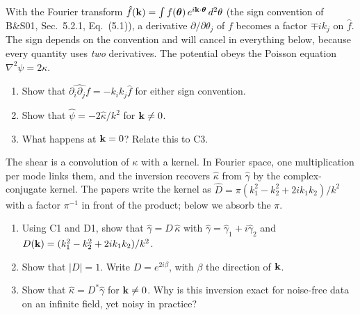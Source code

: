 
\begin{given}
With the Fourier transform $\hat f(\mathbf{k}) = \int f(\bm\theta)\,e^{i\mathbf{k}\cdot\bm\theta}\,d^2\theta$ (the sign convention of
B\&S01, Sec.~5.2.1, Eq.~(5.1)), a derivative $\partial/\partial\theta_j$ of $f$ becomes a factor $\mp i k_j$ on
$\hat f$. The sign depends on the convention and will cancel in everything below, because every quantity uses
\emph{two} derivatives. The potential obeys the Poisson equation $\nabla^2\psi = 2\kappa$.
\end{given}


\begin{enumerate}
  \item Show that $\widehat{\partial_i\partial_j f} = -k_ik_j\hat f$ for either sign convention.
  \item Show that $\hat\psi = -2\hat\kappa/k^2$ for $\mathbf{k} \neq 0$.
  \item What happens at $\mathbf{k} = 0$? Relate this to C3.
\end{enumerate}



\begin{given}
The shear is a convolution of $\kappa$ with a kernel. In Fourier space, one multiplication per mode links them, and
the inversion recovers $\hat\kappa$ from $\hat\gamma$ by the complex-conjugate kernel. The papers write the kernel as
$\hat D = \pi(k_1^2 - k_2^2 + 2ik_1k_2)/k^2$ with a factor $\pi^{-1}$ in front of the product; below we absorb the
$\pi$.
\end{given}


\begin{enumerate}
  \item Using C1 and D1, show that $\hat\gamma = D\,\hat\kappa$ with $\hat\gamma = \hat\gamma_1 + i\hat\gamma_2$ and
    $D(\mathbf{k}) = (k_1^2 - k_2^2 + 2ik_1k_2)/k^2$.
  \item Show that $|D| = 1$. Write $D = e^{2i\beta}$, with $\beta$ the direction of $\mathbf{k}$.
  \item Show that $\hat\kappa = D^*\hat\gamma$ for $\mathbf{k} \neq 0$. Why is this inversion exact for noise-free data on an
    infinite field, yet noisy in practice?
\end{enumerate}

